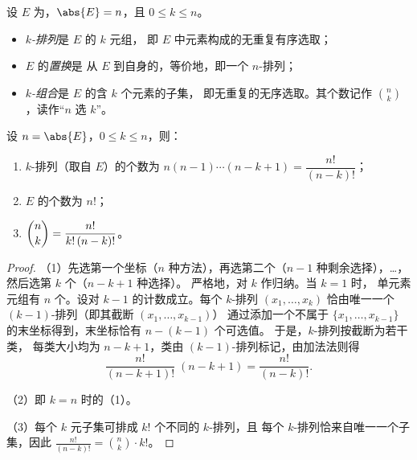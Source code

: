 \begin{definition}[排列、置换与组合]\label{def:b1:counting:objects}
设 $E$ 为，$\abs{E} = n$，且 $0 \leq k \leq n$。
\begin{itemize}
  \item \emph{$k$-排列}是 $E$ 的 $k$ 元组，
        即 $E$ 中元素构成的无重复有序选取；
  \item $E$ 的\emph{置换}是
        从 $E$ 到自身的，等价地，即一个 $n$-排列；
  \item \emph{$k$-组合}是 $E$ 的含 $k$ 个元素的子集，
        即无重复的无序选取。其个数记作
        $\binom{n}{k}$，读作“$n$ 选
        $k$”。
\end{itemize}
\end{definition}

\begin{theorem}[三种计数]\label{thm:b1:counting:counts}
设 $n = \abs{E}$，$0 \leq k \leq n$，则：
\begin{enumerate}
  \item $k$-排列（取自 $E$）的个数为 $n (n-1) \cdots
        (n-k+1) = \dfrac{n!}{(n-k)!}$；
  \item $E$ 的个数为 $n!$；
  \item $\dbinom{n}{k} = \dfrac{n!}{k!\,(n-k)!}$。
\end{enumerate}
\end{theorem}

\begin{proof}
（1）先选第一个坐标（$n$ 种方法），再选第二个（$n - 1$
种剩余选择），\dots，然后选第 $k$ 个（$n - k + 1$ 种选择）。
严格地，对 $k$ 作归纳。当 $k = 1$ 时，
单元素元组有 $n$ 个。设对 $k - 1$ 的计数成立。每个
$k$-排列 $(x_1, \dots, x_k)$ 恰由唯一一个
$(k-1)$-排列（即其截断 $(x_1, \dots, x_{k-1})$）
通过添加一个不属于 $\{x_1, \dots,
x_{k-1}\}$ 的末坐标得到，末坐标恰有 $n - (k - 1)$ 个可选值。
于是，$k$-排列按截断为若干类，
每类大小均为 $n - k + 1$，类由
$(k-1)$-排列标记，由加法法则得
\[
\frac{n!}{(n-k+1)!}\;(n - k + 1) = \frac{n!}{(n-k)!} .
\]

（2）即 $k = n$ 时的（1）。

（3）每个 $k$ 元子集可排成 $k!$ 个不同的 $k$-排列，且
每个 $k$-排列恰来自唯一一个子集，因此
$\frac{n!}{(n-k)!} = \binom nk \cdot k!$。
\end{proof}

